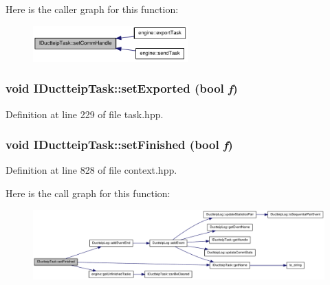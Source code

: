 Here is the caller graph for this function:\nopagebreak
\begin{figure}[H]
\begin{center}
\leavevmode
\includegraphics[width=169pt]{class_i_ductteip_task_ad0ae24379f4794c3363d1e94a1299c03_icgraph}
\end{center}
\end{figure}
\hypertarget{class_i_ductteip_task_a17aaf798213e43023a50f854fa236953}{
\subsubsection[{setExported}]{\setlength{\rightskip}{0pt plus 5cm}void IDuctteipTask::setExported (bool {\em f})}}
\label{class_i_ductteip_task_a17aaf798213e43023a50f854fa236953}


Definition at line 229 of file task.hpp.\hypertarget{class_i_ductteip_task_abef058563393dffda702745c2503998f}{
\subsubsection[{setFinished}]{\setlength{\rightskip}{0pt plus 5cm}void IDuctteipTask::setFinished (bool {\em f})}}
\label{class_i_ductteip_task_abef058563393dffda702745c2503998f}


Definition at line 828 of file context.hpp.

Here is the call graph for this function:\nopagebreak
\begin{figure}[H]
\begin{center}
\leavevmode
\includegraphics[width=420pt]{class_i_ductteip_task_abef058563393dffda702745c2503998f_cgraph}
\end{center}
\end{figure}


